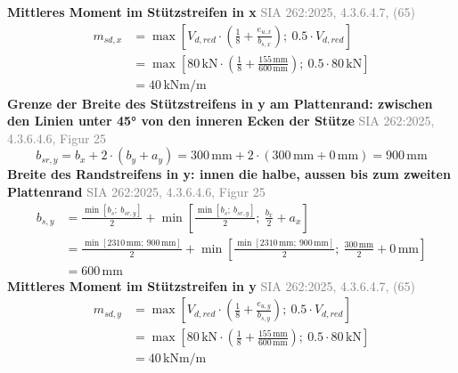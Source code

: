 \documentclass[11pt,a4paper]{article}
\newcommand{\normref}[1]{{\small\textcolor{gray}{#1}}}
\begin{document}
\noindent\textbf{Mittleres Moment im Stützstreifen in x} \hfill \normref{SIA 262:2025, 4.3.6.4.7, (65)}
\begin{equation*}
\begin{aligned}
  m_{sd,x} &= \max\left[V_{d,red} \cdot \left(\frac{1}{8} + \frac{e_{u,x}}{b_{s,x}}\right);\ 0.5 \cdot V_{d,red}\right] \\
  &= \max\left[80\,\mathrm{kN} \cdot \left(\frac{1}{8} + \frac{155\,\mathrm{mm}}{600\,\mathrm{mm}}\right);\ 0.5 \cdot 80\,\mathrm{kN}\right] \\
  &= 40\,\mathrm{kNm}/\mathrm{m}
\end{aligned}
\end{equation*}
\noindent\textbf{Grenze der Breite des Stützstreifens in y am Plattenrand: zwischen den Linien unter 45° von den inneren Ecken der Stütze} \hfill \normref{SIA 262:2025, 4.3.6.4.6, Figur 25}
\begin{equation*}
b_{sr,y} = b_x + 2 \cdot \left(b_y + a_y\right) = 300\,\mathrm{mm} + 2 \cdot \left(300\,\mathrm{mm} + 0\,\mathrm{mm}\right) = 900\,\mathrm{mm}
\end{equation*}
\noindent\textbf{Breite des Randstreifens in y: innen die halbe, aussen bis zum zweiten Plattenrand} \hfill \normref{SIA 262:2025, 4.3.6.4.6, Figur 25}
\begin{equation*}
\begin{aligned}
  b_{s,y} &= \frac{\min\left[b_s;\ b_{sr,y}\right]}{2} + \min\left[\frac{\min\left[b_s;\ b_{sr,y}\right]}{2};\ \frac{b_x}{2} + a_x\right] \\
  &= \frac{\min\left[2310\,\mathrm{mm};\ 900\,\mathrm{mm}\right]}{2} + \min\left[\frac{\min\left[2310\,\mathrm{mm};\ 900\,\mathrm{mm}\right]}{2};\ \frac{300\,\mathrm{mm}}{2} + 0\,\mathrm{mm}\right] \\
  &= 600\,\mathrm{mm}
\end{aligned}
\end{equation*}
\noindent\textbf{Mittleres Moment im Stützstreifen in y} \hfill \normref{SIA 262:2025, 4.3.6.4.7, (65)}
\begin{equation*}
\begin{aligned}
  m_{sd,y} &= \max\left[V_{d,red} \cdot \left(\frac{1}{8} + \frac{e_{u,y}}{b_{s,y}}\right);\ 0.5 \cdot V_{d,red}\right] \\
  &= \max\left[80\,\mathrm{kN} \cdot \left(\frac{1}{8} + \frac{155\,\mathrm{mm}}{600\,\mathrm{mm}}\right);\ 0.5 \cdot 80\,\mathrm{kN}\right] \\
  &= 40\,\mathrm{kNm}/\mathrm{m}
\end{aligned}
\end{equation*}
\end{document}
